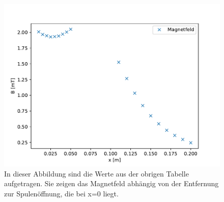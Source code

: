 \documentclass[titlepage = firstcover]{scrartcl}
\begin{document}
            \begin{figure}[h]
                \centering
                \includegraphics{HelmholtzA.pdf}
                \caption{In dieser Abbildung sind die Werte aus der obrigen Tabelle aufgetragen. Sie zeigen das Magnetfeld abhängig von der Entfernung zur Spulenöffnung, die bei x=0 liegt.}
                \label{fig:HelmholtzA}

            \end{figure}

            \FloatBarrier
            \newpage
\end{document}
